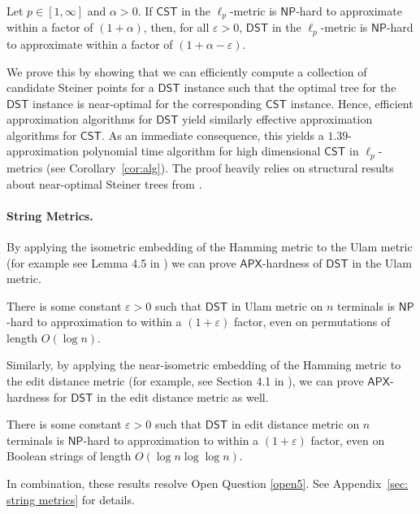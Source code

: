 \documentclass{theoretics}
\newcommand{\1}{\textbf{1}}
\newcommand{\cst}{$\mathsf{CST}$\xspace}
\newcommand{\dst}{$\mathsf{DST}$\xspace}
\newcommand{\np}{$\mathsf{NP}$\xspace}
\newcommand{\apx}{$\mathsf{APX}$\xspace}
\begin{document}
\begin{theorem}\label{thm:csttodstintro}
Let $p \in [1,\infty]$ and $\alpha>0$. If \cst in the $\ell_p$-metric is \np-hard to approximate within a factor of $(1 + \alpha)$, then, for all $\varepsilon > 0$, \dst in the $\ell_p$-metric is \np-hard to approximate within a factor of $(1 + \alpha - \varepsilon)$.
\end{theorem}

We prove this by showing that we can efficiently compute  a collection of candidate Steiner points for a \dst instance such that the optimal tree for the \dst instance is near-optimal for the corresponding \cst instance. Hence, efficient approximation algorithms for \dst yield similarly effective approximation algorithms for \cst. As an immediate consequence, this yields a $1.39$-approximation polynomial time algorithm for high dimensional \cst in $\ell_p$-metrics (see Corollary~\ref{cor:alg}). The proof heavily relies on structural results about near-optimal Steiner trees from \cite{DuZhangFeng91, Borchers97, Bartal_Gottlieb_2021}. 

 \paragraph{String Metrics.} By applying the isometric embedding of the 
Hamming metric to the Ulam metric (for example see Lemma 4.5 in \cite{DBLP:journals/corr/abs-2112-03222}) we can prove \apx-hardness of \dst in the Ulam metric. 
\begin{theorem} \label{thm: ulam hardness}
There is some constant $\varepsilon > 0$ such that \dst in Ulam metric on $n$ terminals is \np-hard to approximation to within a $(1+\varepsilon)$ factor, even on permutations of length $O(\log n)$. 
\end{theorem}
Similarly, by applying the near-isometric embedding of the Hamming metric to the edit distance metric (for example, see Section 4.1 in \cite{DBLP:conf/stoc/Rubinstein18}), we can prove \apx-hardness for \dst in the edit distance metric  as well. 
\begin{theorem} \label{thm: edit hardness}
There is some constant $\varepsilon > 0$ such that \dst in edit distance metric on $n$ terminals is \np-hard to approximation to within a $(1+\varepsilon)$ factor, even on Boolean strings of length $O(\log n \log \log n)$. 
\end{theorem}
In combination, these results resolve Open Question \ref{open5}. See Appendix~\ref{sec: string metrics} for details.
\end{document}
